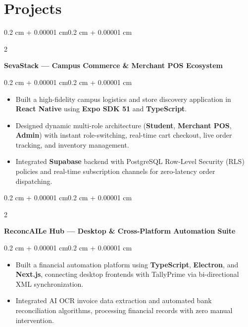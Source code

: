 \documentclass[10pt, a4paper]{article}
\newenvironment{highlights}{
    \begin{itemize}[
        topsep=0.06 cm,
        parsep=0.05 cm,
        partopsep=0pt,
        itemsep=0pt,
        leftmargin=0.4 cm + 10pt
    ]
}{
    \end{itemize}
}
\newenvironment{onecolentry}{
    \begin{adjustwidth}{0.2 cm + 0.00001 cm}{0.2 cm + 0.00001 cm}
}{
    \end{adjustwidth}
}
\newenvironment{twocolentry}[2][]{
    \onecolentry
    \def\secondColumn{#2}
    \setcolumnwidth{\fill, 4.5 cm}
    \begin{paracol}{2}
}{
    \switchcolumn \raggedleft \secondColumn
    \end{paracol}
    \endonecolentry
}
\let\hrefWithoutArrow\href
\renewcommand{\href}[2]{\hrefWithoutArrow{#1}{\ifthenelse{\equal{#2}{}}{ }{#2 }\raisebox{.15ex}{\footnotesize \faExternalLink*}}}
\begin{document}
\section{Projects}
\begin{twocolentry}{\textit{\href{https://github.com/I-am-Manu-Singh/SevaStack-App}{\underline{Repo}}}}
    \textbf{SevaStack — Campus Commerce \& Merchant POS Ecosystem}
\end{twocolentry}
\vspace{0.06 cm}
\begin{onecolentry}
    \begin{highlights}
    \item Built a high-fidelity campus logistics and store discovery application in \textbf{React Native} using \textbf{Expo SDK 51} and \textbf{TypeScript}.
    \item Designed dynamic multi-role architecture (\textbf{Student}, \textbf{Merchant POS}, \textbf{Admin}) with instant role-switching, real-time cart checkout, live order tracking, and inventory management.
    \item Integrated \textbf{Supabase} backend with PostgreSQL Row-Level Security (RLS) policies and real-time subscription channels for zero-latency order dispatching.
    \end{highlights}
\end{onecolentry}
\vspace{0.14 cm}

\begin{twocolentry}{\textit{\href{https://github.com/I-am-Manu-Singh/reconcAIle-Hub}{\underline{Repo}}}}
    \textbf{ReconcAILe Hub — Desktop \& Cross-Platform Automation Suite}
\end{twocolentry}
\vspace{0.06 cm}
\begin{onecolentry}
    \begin{highlights}
    \item Built a financial automation platform using \textbf{TypeScript}, \textbf{Electron}, and \textbf{Next.js}, connecting desktop frontends with TallyPrime via bi-directional XML synchronization.
    \item Integrated AI OCR invoice data extraction and automated bank reconciliation algorithms, processing financial records with zero manual intervention.
    \end{highlights}
\end{onecolentry}
\vspace{0.14 cm}
\end{document}
